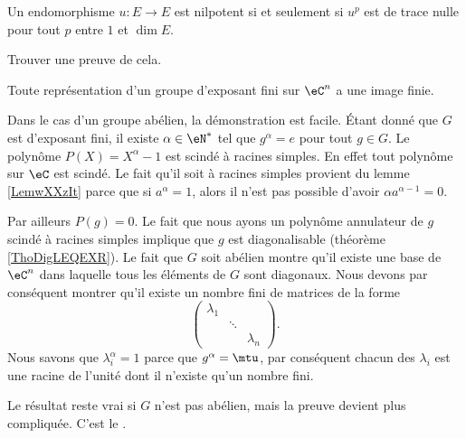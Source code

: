 \begin{lemma}
    Un endomorphisme \( u\colon E\to E\) est nilpotent si et seulement si \( u^p\) est de trace nulle pour tout \( p\) entre \( 1\) et \( \dim E\).
\end{lemma}

\begin{probleme}
    Trouver une preuve de cela.
\end{probleme}

\begin{theorem}     \label{ThoBurnsideoPuCtS}
    Toute représentation d'un groupe d'exposant fini sur \( \eC^n\) a une image finie.
\end{theorem}

Dans le cas d'un groupe abélien, la démonstration est facile. Étant donné que \( G\) est d'exposant fini, il existe \( \alpha\in \eN^*\) tel que \( g^{\alpha}=e\) pour tout \( g\in G\). Le polynôme \( P(X)=X^{\alpha}-1\) est scindé à racines simples. En effet tout polynôme sur \( \eC\) est scindé. Le fait qu'il soit à racines simples provient du lemme \ref{LemwXXzIt} parce que si \( a^{\alpha}=1\), alors il n'est pas possible d'avoir \( \alpha a^{\alpha-1}=0\).

Par ailleurs \( P(g)=0\). Le fait que nous ayons un polynôme annulateur de \( g\) scindé à racines simples implique que \( g\) est diagonalisable (théorème \ref{ThoDigLEQEXR}). Le fait que \( G\) soit abélien montre qu'il existe une base de \( \eC^n\) dans laquelle tous les éléments de \( G\) sont diagonaux. Nous devons par conséquent montrer qu'il existe un nombre fini de matrices de la forme
\begin{equation}
    \begin{pmatrix}
        \lambda_1    &       &       \\
            &   \ddots    &       \\
            &       &   \lambda_n
    \end{pmatrix}.
\end{equation}
Nous savons que \( \lambda_i^{\alpha}=1\) parce que \( g^{\alpha}=\mtu\), par conséquent chacun des \( \lambda_i\) est une racine de l'unité dont il n'existe qu'un nombre fini.

Le résultat reste vrai si \( G\) n'est pas abélien, mais la preuve devient plus compliquée. C'est le .

